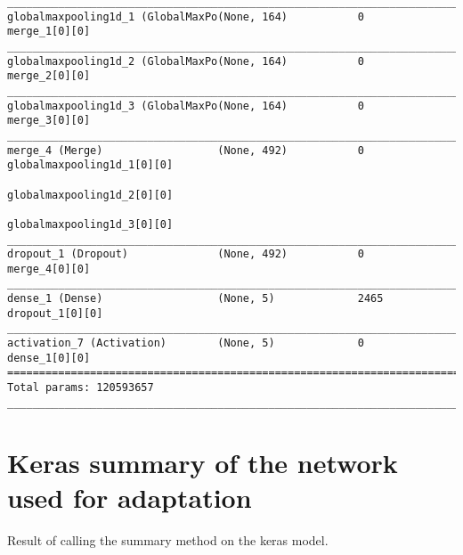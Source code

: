 \begin{lstlisting}[basicstyle=\tiny,frame=single]
____________________________________________________________________________________________________
globalmaxpooling1d_1 (GlobalMaxPo(None, 164)           0           merge_1[0][0]
____________________________________________________________________________________________________
globalmaxpooling1d_2 (GlobalMaxPo(None, 164)           0           merge_2[0][0]
____________________________________________________________________________________________________
globalmaxpooling1d_3 (GlobalMaxPo(None, 164)           0           merge_3[0][0]
____________________________________________________________________________________________________
merge_4 (Merge)                  (None, 492)           0           globalmaxpooling1d_1[0][0]
                                                                   globalmaxpooling1d_2[0][0]
                                                                   globalmaxpooling1d_3[0][0]
____________________________________________________________________________________________________
dropout_1 (Dropout)              (None, 492)           0           merge_4[0][0]                      
____________________________________________________________________________________________________  
dense_1 (Dense)                  (None, 5)             2465        dropout_1[0][0]                    
____________________________________________________________________________________________________  
activation_7 (Activation)        (None, 5)             0           dense_1[0][0]                      
====================================================================================================  
Total params: 120593657                            
____________________________________________________________________________________________________  
\end{lstlisting}

\section{Keras summary of the network used for adaptation}

Result of calling the summary method on the keras model.


